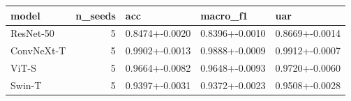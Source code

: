 \begin{tabular}{lrlll}
\toprule
model & n_seeds & acc & macro_f1 & uar \\
\midrule
ResNet-50 & 5 & 0.8474+-0.0020 & 0.8396+-0.0010 & 0.8669+-0.0014 \\
ConvNeXt-T & 5 & 0.9902+-0.0013 & 0.9888+-0.0009 & 0.9912+-0.0007 \\
ViT-S & 5 & 0.9664+-0.0082 & 0.9648+-0.0093 & 0.9720+-0.0060 \\
Swin-T & 5 & 0.9397+-0.0031 & 0.9372+-0.0023 & 0.9508+-0.0028 \\
\bottomrule
\end{tabular}
